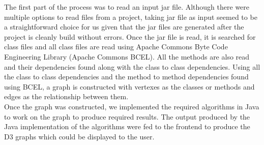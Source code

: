 The first part of the process was to read an input jar file. Although there were multiple options to read files from a project, taking jar file as input seemed to be a straightforward choice for us given that the jar files are generated after the project is cleanly build without errors. Once the jar file is read, it is searched for class files and all class files are read using Apache Commons Byte Code Engineering Library (Apache Commons BCEL\texttrademark). All the methods are also read and their dependencies found along with the class to class dependencies. Using all the class to class dependencies and the method to method dependencies found using BCEL, a graph is constructed with vertexes as the classes or methods and edges as the relationship between them. \\

Once the graph was constructed, we implemented the required algorithms in Java to work on the graph to produce required results. The output produced by the Java implementation of the algorithms were fed to the frontend to produce the D3 graphs which could be displayed to the user.
